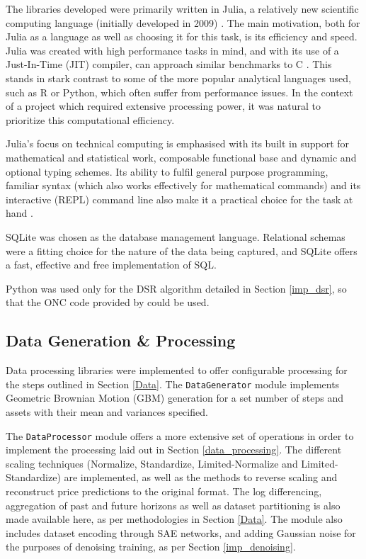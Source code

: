 \documentclass[a4paper,11pt,oneside]{article}
\theoremstyle{plain}
\theoremstyle{definition}
\begin{document}
	The libraries developed were primarily written in Julia, a relatively new scientific computing language (initially developed in 2009) \citep{DCRoot, Julia}. The main motivation, both for Julia as a language as well as choosing it for this task, is its efficiency and speed. Julia was created with high performance tasks in mind, and with its use of a Just-In-Time (JIT) compiler, can approach similar benchmarks to C \citep{Perkel}. This stands in stark contrast to some of the more popular analytical languages used, such as R or Python, which often suffer from performance issues. In the context of a project which required extensive processing power, it was natural to prioritize this computational efficiency. \newline
	
	Julia's focus on technical computing is emphasised with its built in support for mathematical and statistical work, composable functional base and dynamic and optional typing schemes. Its ability to fulfil general purpose programming, familiar syntax (which also works effectively for mathematical commands) and its interactive (REPL) command line also make it a practical choice for the task at hand \citep{Perkel}.\newline
	
	SQLite was chosen as the database management language. Relational schemas were a fitting choice for the nature of the data being captured, and SQLite offers a fast, effective and free implementation of SQL.\newline
	
	Python was used only for the DSR algorithm detailed in Section \ref{imp_dsr}, so that the ONC code provided by \citet{PradoDSR} could be used.\newline
	
	\subsection{Data Generation \& Processing}
	
	Data processing libraries were implemented to offer configurable processing for the steps outlined in Section \ref{Data}. The \texttt{DataGenerator} module \citep{DCDataGenerator} implements Geometric Brownian Motion (GBM) generation for a set number of steps and assets with their mean and variances specified. \newline
	
	The \texttt{DataProcessor} module \citep{DCDataProcessor} offers a more extensive set of operations in order to implement the processing laid out in Section \ref{data_processing}. The different scaling techniques (Normalize, Standardize, Limited-Normalize and Limited-Standardize) are implemented, as well as the methods to reverse scaling and reconstruct price predictions to the original format. The log differencing, aggregation of past and future horizons as well as dataset partitioning is also made available here, as per methodologies in Section \ref{Data}. The module also includes dataset encoding through SAE networks, and adding Gaussian noise for the purposes of denoising training, as per Section \ref{imp_denoising}.
	
\end{document}
